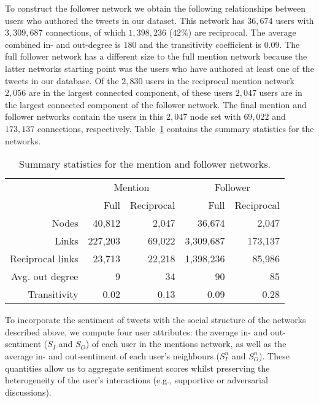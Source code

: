 \documentclass{article}
\begin{document}
To construct the follower network we obtain the following
relationships between users who authored the tweets in our
dataset. This network has $36,674$ users with $3,309,687$ connections,
of which $1,398,236$ ($42\%$) are reciprocal. The average combined in-
and out-degree is $180$ and the transitivity coefficient is
$0.09$. The full follower network has a different size to the full
mention network because the latter networks starting point was the
users who have authored at least one of the tweets in our database.
Of the $2,830$ users in the reciprocal mention network $2,056$ are in
the largest connected component, of these users $2,047$ users are in
the largest connected component of the follower network.  The final
mention and follower networks contain the users in this $2,047$ node
set with $69,022$ and $173,137$ connections,
respectively. Table~\ref{tab:NetSummary} contains the summary
statistics for the networks.
\begin{table}[tp]
\centering
\begin{tabular}{r|rr|rr}
  \multicolumn{1}{l|}{} & \multicolumn{2}{c|}{Mention} &
  \multicolumn{2}{c}{Follower} \\
  & Full        & Reciprocal    & Full          & Reciprocal    \\ \hline
  Nodes         & 40,812        & 2,047         & 36,674        & 2,047 \\
  Links         & 227,203       & 69,022        & 3,309,687     & 173,137 \\
  Reciprocal links & 23,713     & 22,218        & 1,398,236     & 85,986 \\
  Avg. out degree  & 9          & 34            & 90            & 85     \\
  Transitivity     & 0.02       & 0.13          & 0.09          & 0.28   \\ 
\end{tabular}
\caption{Summary statistics for the mention and follower
  networks.}\label{tab:NetSummary}
\end{table}

To incorporate the sentiment of tweets with the social structure of
the networks described above, we compute four user attributes: the
average in- and out-sentiment ($S_I$ and $S_O$) of each user in the
mentions network, as well as the average in- and out-sentiment of each
user's neighbours ($S^{n}_I$ and $S^{n}_O$). These quantities allow us
to aggregate sentiment scores whilst preserving the heterogeneity of
the user's interactions (e.g., supportive or adversarial discussions).
\end{document}
